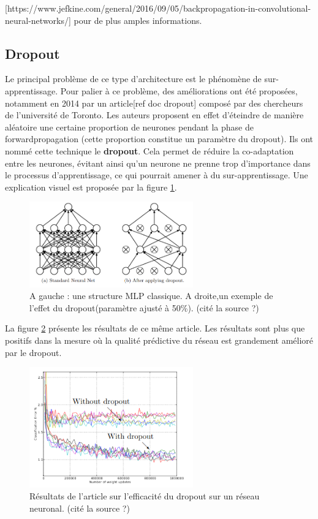  [https://www.jefkine.com/general/2016/09/05/backpropagation-in-convolutional-neural-networks/] pour de plus amples informations.
 
\subsection{Dropout}

Le principal problème de ce type d'architecture est le phénomène de sur-apprentissage. Pour palier à ce problème, des améliorations ont été proposées, notamment en 2014 par un article[ref doc dropout] composé par des chercheurs de l'université de Toronto. Les auteurs proposent en effet d'éteindre de manière aléatoire une certaine proportion de neurones pendant la phase de forwardpropagation (cette proportion constitue un paramètre du dropout). Ils ont nommé cette technique le \textbf{dropout}. Cela permet de réduire la co-adaptation entre les neurones, évitant ainsi qu'un neurone ne prenne trop d'importance dans le processus d'apprentissage, ce qui pourrait amener à du sur-apprentissage. Une explication visuel est proposée par la figure \ref{dropout}.
 
\begin{figure}[!h]
\centering
\includegraphics[width=200pt]{images/cnn/dropout.png}
\caption{A gauche : une structure MLP classique. A droite,un exemple de l'effet du dropout(paramètre ajusté à 50\%). (cité la source ?) }
\label{dropout}
\end{figure}

La figure \ref{dropout_article} présente les résultats de ce même article. Les résultats sont plus que positifs dans la mesure où la qualité prédictive du réseau est grandement amélioré par le dropout.

\begin{figure}[!h]
\centering
\includegraphics[width=200pt]{images/cnn/dropout_article.png}
\caption{Résultats de l'article sur l'efficacité du dropout sur un réseau neuronal. (cité la source ?) }
\label{dropout_article}
\end{figure}
 
